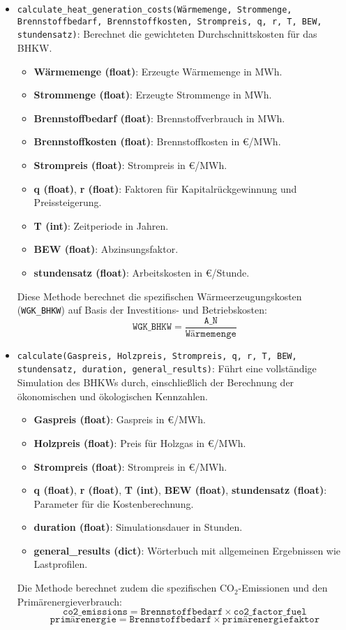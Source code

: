 \begin{itemize}
    \item \texttt{calculate\_heat\_generation\_costs(Wärmemenge, Strommenge, Brennstoffbedarf, Brennstoffkosten, Strompreis, q, r, T, BEW, stundensatz)}: Berechnet die gewichteten Durchschnittskosten für das BHKW.
    \begin{itemize}
        \item \textbf{Wärmemenge (float)}: Erzeugte Wärmemenge in MWh.
        \item \textbf{Strommenge (float)}: Erzeugte Strommenge in MWh.
        \item \textbf{Brennstoffbedarf (float)}: Brennstoffverbrauch in MWh.
        \item \textbf{Brennstoffkosten (float)}: Brennstoffkosten in €/MWh.
        \item \textbf{Strompreis (float)}: Strompreis in €/MWh.
        \item \textbf{q (float)}, \textbf{r (float)}: Faktoren für Kapitalrückgewinnung und Preissteigerung.
        \item \textbf{T (int)}: Zeitperiode in Jahren.
        \item \textbf{BEW (float)}: Abzinsungsfaktor.
        \item \textbf{stundensatz (float)}: Arbeitskosten in €/Stunde.
    \end{itemize}
    Diese Methode berechnet die spezifischen Wärmeerzeugungskosten (\texttt{WGK\_BHKW}) auf Basis der Investitions- und Betriebskosten:
    \[
    \texttt{WGK\_BHKW} = \frac{\texttt{A\_N}}{\texttt{Wärmemenge}}
    \]

    \item \texttt{calculate(Gaspreis, Holzpreis, Strompreis, q, r, T, BEW, stundensatz, duration, general\_results)}: Führt eine vollständige Simulation des BHKWs durch, einschließlich der Berechnung der ökonomischen und ökologischen Kennzahlen.
    \begin{itemize}
        \item \textbf{Gaspreis (float)}: Gaspreis in €/MWh.
        \item \textbf{Holzpreis (float)}: Preis für Holzgas in €/MWh.
        \item \textbf{Strompreis (float)}: Strompreis in €/MWh.
        \item \textbf{q (float)}, \textbf{r (float)}, \textbf{T (int)}, \textbf{BEW (float)}, \textbf{stundensatz (float)}: Parameter für die Kostenberechnung.
        \item \textbf{duration (float)}: Simulationsdauer in Stunden.
        \item \textbf{general\_results (dict)}: Wörterbuch mit allgemeinen Ergebnissen wie Lastprofilen.
    \end{itemize}
    Die Methode berechnet zudem die spezifischen CO$_2$-Emissionen und den Primärenergieverbrauch:
    \[
    \texttt{co2\_emissions} = \texttt{Brennstoffbedarf} \times \texttt{co2\_factor\_fuel}
    \]
    \[
    \texttt{primärenergie} = \texttt{Brennstoffbedarf} \times \texttt{primärenergiefaktor}
    \]
\end{itemize}


